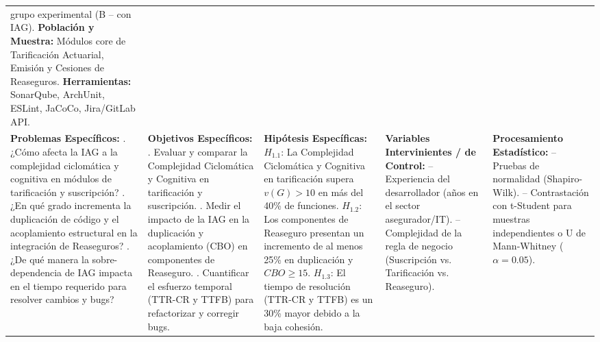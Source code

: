 \begin{landscape}
\begin{spacing}{1}
\begin{longtable}{@{}p{4.9cm}p{4.9cm}p{4.9cm}p{4.9cm}p{4.9cm}@{}}
grupo experimental (B -- con IAG). \newline
\textbf{Población y Muestra:} Módulos core de Tarificación Actuarial,
Emisión y Cesiones de Reaseguros. \newline
\textbf{Herramientas:} SonarQube, ArchUnit, ESLint, JaCoCo, Jira/GitLab API.
\\
\textbf{Problemas Específicos:} \newline
1. ¿Cómo afecta la IAG a la complejidad ciclomática y cognitiva en módulos
de tarificación y suscripción? \newline
2. ¿En qué grado incrementa la duplicación de código y el acoplamiento
estructural en la integración de Reaseguros? \newline
3. ¿De qué manera la sobre-dependencia de IAG impacta en el tiempo requerido
para resolver cambios y bugs?
&
\textbf{Objetivos Específicos:} \newline
1. Evaluar y comparar la Complejidad Ciclomática y Cognitiva en tarificación
y suscripción. \newline
2. Medir el impacto de la IAG en la duplicación y acoplamiento (CBO) en
componentes de Reaseguro. \newline
3. Cuantificar el esfuerzo temporal (TTR-CR y TTFB) para refactorizar y
corregir bugs.
&
\textbf{Hipótesis Específicas:} \newline
$H_{1.1}$: La Complejidad Ciclomática y Cognitiva en tarificación supera
$v(G) > 10$ en más del 40\% de funciones. \newline
$H_{1.2}$: Los componentes de Reaseguro presentan un incremento de al menos
25\% en duplicación y $CBO \ge 15$. \newline
$H_{1.3}$: El tiempo de resolución (TTR-CR y TTFB) es un 30\% mayor debido a
la baja cohesión.
&
\textbf{Variables Intervinientes / de Control:} \newline
-- Experiencia del desarrollador (años en el sector asegurador/IT). \newline
-- Complejidad de la regla de negocio (Suscripción vs. Tarificación vs.
Reaseguro).
&
\textbf{Procesamiento Estadístico:} \newline
-- Pruebas de normalidad (Shapiro-Wilk). \newline
-- Contrastación con t-Student para muestras independientes o U de
Mann-Whitney ($\alpha = 0.05$).
\\
\end{longtable}
\setlength{\tabcolsep}{6pt}
\normalsize
\end{spacing}
\makeatother
\end{landscape}
\ClearShipoutPictureFG
\pagestyle{fancy}
\restoregeometry
